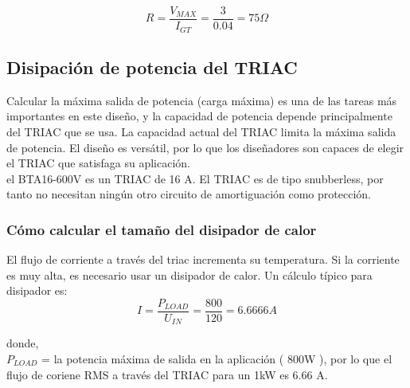     \begin{equation}
        R = \frac{ V_{MAX} }{ I_{GT} }  =    \frac{3}{0.04} =   75\Omega
    \end{equation}
    
\subsection{Disipación de potencia del TRIAC}
    Calcular la máxima salida de potencia (carga máxima) es una de las tareas más importantes en este diseño, y la capacidad de potencia depende principalmente del TRIAC que se usa. La capacidad actual del TRIAC limita la máxima salida de potencia. El diseño es versátil, por lo que los diseñadores son capaces de elegir el TRIAC que satisfaga su aplicación.\\
    
    el BTA16-600V es un TRIAC de 16 A. El TRIAC es de tipo snubberless, por tanto no necesitan ningún otro circuito de amortiguación como protección. 
    
        \subsubsection*{Cómo calcular el tamaño del disipador de calor}
            El flujo de corriente a través del triac incrementa su temperatura. Si la corriente es muy alta, es necesario usar un disipador de calor. Un cálculo típico para disipador es:\\
            
            \begin{equation}
                I   
                =   \frac{ P_{LOAD} }{ U_{IN} }  
                =   \frac{800}{120}    
                =   6.6666 A
            \end{equation}
        
            donde,\\
            $P_{LOAD}$ = la potencia máxima de salida en la aplicación ( 800W ), por lo que el flujo de coriene RMS a través del TRIAC para un 1kW es 6.66 A.
        